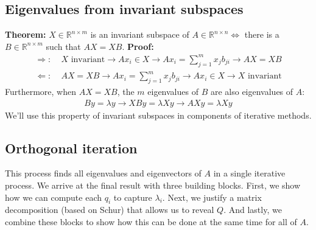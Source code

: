 \documentclass{article}
\begin{document}
\subsection{Eigenvalues from invariant subspaces}
\textbf{Theorem:} $X \in \mathbb{R}^{n \times m}$ is an invariant subspace of $A \in \mathbb{R}^{n \times n} \Leftrightarrow$ there is a $B \in \mathbb{R}^{n \times m}$ such that $AX = XB$. \textbf{Proof:}
\begin{align*}
    \Rightarrow: \;& X \textrm{ invariant} \longrightarrow Ax_i \in X \longrightarrow Ax_i = \sum_{j=1}^mx_jb_{ji} \longrightarrow AX = XB\\
    \Leftarrow: \;& AX = XB \longrightarrow Ax_i = \sum_{j=1}^mx_jb_{ji} \longrightarrow Ax_i \in X \longrightarrow X \textrm{ invariant}
\end{align*}
Furthermore, when $AX = XB$, the $m$ eigenvalues of $B$ are also eigenvalues of $A$: 
\begin{align*}
    By = \lambda y \longrightarrow XBy = \lambda Xy \longrightarrow AXy = \lambda Xy
\end{align*}
We'll use this property of invariant subspaces in components of iterative methods. 

\subsection{Orthogonal iteration}
This process finds all eigenvalues and eigenvectors of $A$ in a single iterative process. We arrive at the final result with three building blocks. First, we show how we can compute each $q_i$ to capture $\lambda_i$. Next, we justify a matrix decomposition (based on Schur) that allows us to reveal $Q$. And lastly, we combine these blocks to show how this can be done at the same time for all of $A$.
\end{document}
